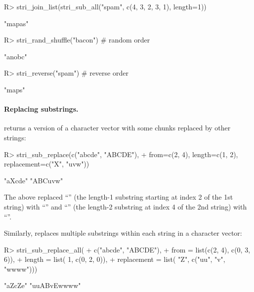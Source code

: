 \documentclass[nojss]{jss}
\begin{document}
\begin{Schunk}
\begin{Sinput}
R> stri_join_list(stri_sub_all("spam", c(4, 3, 2, 3, 1), length=1))
\end{Sinput}
\begin{Soutput}
[1] "mapas"
\end{Soutput}
\begin{Sinput}
R> stri_rand_shuffle("bacon")  # random order
\end{Sinput}
\begin{Soutput}
[1] "anobc"
\end{Soutput}
\begin{Sinput}
R> stri_reverse("spam")        # reverse order
\end{Sinput}
\begin{Soutput}
[1] "maps"
\end{Soutput}
\end{Schunk}
\fi

\paragraph{Replacing substrings.}
 returns a version
of a character vector with some chunks replaced by other
strings:

\begin{Schunk}
\begin{Sinput}
R> stri_sub_replace(c("abcde", "ABCDE"),
+    from=c(2, 4), length=c(1, 2), replacement=c("X", "uvw"))
\end{Sinput}
\begin{Soutput}
[1] "aXcde"  "ABCuvw"
\end{Soutput}
\end{Schunk}

\noindent
The above replaced ``'' (the length-1 substring
starting at index 2 of the 1st string) with ``''
and ``''
(the length-2 substring at index 4 of the 2nd string)
with ``''.


Similarly,  replaces
multiple substrings within each string in a character vector:

\begin{Schunk}
\begin{Sinput}
R> stri_sub_replace_all(
+                     c("abcde",  "ABCDE"),
+    from        = list(c(2, 4),  c(0,    3,   6)),
+    length      = list(  1,      c(0,    2,   0)),
+    replacement = list(  "Z",    c("uu", "v", "wwww")))
\end{Sinput}
\begin{Soutput}
[1] "aZcZe"      "uuABvEwwww"
\end{Soutput}
\end{Schunk}
\end{document}
